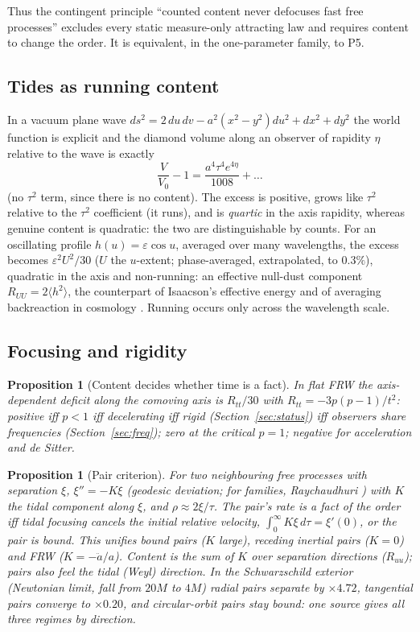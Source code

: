 \documentclass[11pt]{article}
\newtheorem{proposition}[theorem]{Proposition}
\theoremstyle{definition}
\theoremstyle{remark}
\begin{document}
Thus the contingent principle ``counted content never defocuses fast free processes'' excludes every static measure-only attracting law and requires content to change the order. It is equivalent, in the one-parameter family, to P5.

\subsection{Tides as running content}

In a vacuum plane wave $ds^2=2\,du\,dv-a^2(x^2-y^2)du^2+dx^2+dy^2$ the world function is explicit and the diamond volume along an observer of rapidity $\eta$ relative to the wave is exactly
\[
\frac{V}{V_0}-1=\frac{a^4\tau^4e^{4\eta}}{1008}+\dots
\]
(no $\tau^2$ term, since there is no content). The excess is positive, grows like $\tau^2$ relative to the $\tau^2$ coefficient (it runs), and is \emph{quartic} in the axis rapidity, whereas genuine content is quadratic: the two are distinguishable by counts. For an oscillating profile $h(u)=\varepsilon\cos u$, averaged over many wavelengths, the excess becomes $\varepsilon^2U^2/30$ ($U$ the $u$-extent; phase-averaged, extrapolated, to $0.3\%$), quadratic in the axis and non-running: an effective null-dust component $R_{UU}=2\langle h^2\rangle$, the counterpart of Isaacson's effective energy \cite{isaacson} and of averaging backreaction in cosmology \cite{buchert}. Running occurs only across the wavelength scale.

\subsection{Focusing and rigidity}

\begin{proposition}[Content decides whether time is a fact]
In flat FRW the axis-dependent deficit along the comoving axis is $R_{tt}/30$ with $R_{tt}=-3p(p-1)/t^2$: positive iff $p<1$ iff decelerating iff rigid (Section~\ref{sec:status}) iff observers share frequencies (Section~\ref{sec:freq}); zero at the critical $p=1$; negative for acceleration and de Sitter.
\end{proposition}

\begin{proposition}[Pair criterion]
For two neighbouring free processes with separation $\xi$, $\xi''=-K\xi$ (geodesic deviation; for families, Raychaudhuri \cite{raychaudhuri}) with $K$ the tidal component along $\xi$, and $\rho\approx2\xi/\tau$. The pair's rate is a fact of the order iff tidal focusing cancels the initial relative velocity, $\int_0^\infty K\xi\,d\tau=\xi'(0)$, or the pair is bound. This unifies bound pairs ($K$ large), receding inertial pairs ($K=0$) and FRW ($K=-\ddot a/a$). Content is the sum of $K$ over separation directions ($R_{uu}$); pairs also feel the tidal (Weyl) direction. In the Schwarzschild exterior (Newtonian limit, fall from $20M$ to $4M$) radial pairs separate by $\times4.72$, tangential pairs converge to $\times0.20$, and circular-orbit pairs stay bound: one source gives all three regimes by direction.
\end{proposition}
\end{document}
